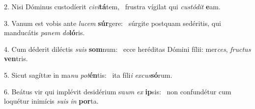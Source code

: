 2. Nisi Dóminus custodíerit \textit{ci}\textit{vi}\textbf{tá}tem, \ast\  frustra vígilat qui \textit{cus}\textit{tó}\textit{dit} \textbf{e}am.\

3. Vanum est vobis ante \textit{lu}\textit{cem} \textbf{súr}gere: \ast\  súrgite postquam sedéritis, qui manducátis \textit{pa}\textit{nem} \textit{do}\textbf{ló}ris.\

4. Cum déderit diléctis \textit{su}\textit{is} \textbf{som}num: \ast\  ecce heréditas Dómini fílii: mer\textit{ces}, \textit{fruc}\textit{tus} \textbf{ven}tris.\

5. Sicut sagíttæ in ma\textit{nu} \textit{pot}\textbf{én}tis: \ast\  ita fíli\textit{i} \textit{ex}\textit{cus}\textbf{só}rum.\

6. Beátus vir qui implévit desidérium su\textit{um} \textit{ex} \textbf{ip}sis: \ast\  non confundétur cum loquétur inimícis \textit{su}\textit{is} \textit{in} \textbf{por}ta.\


